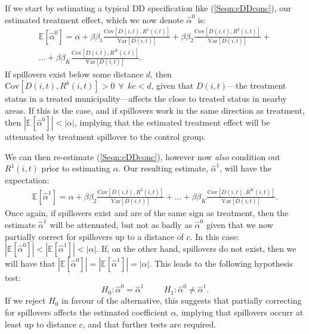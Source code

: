 \documentclass{article}
\newcommand{\Var}{\mathrm{Var}}
\newcommand{\Cov}{\mathrm{Cov}}
\newcommand{\Bias}[2]{\frac{\Cov[#1,#2]}{\Var[#1]}}
\begin{document}
\begin{spacing}{1.1}
If we start by estimating a typical DD specification like (\ref{Seqn:cDDconc}),
our estimated treatment effect, which we now denote $\hat\alpha^0$ is:
\begin{equation}
\nonumber
\begin{split}
\mathbb{E}[\hat\alpha^0]=\alpha + \beta\beta_1\Bias{D(i,t)}{R^1(i,t)}
                                + \beta\beta_2\Bias{D(i,t)}{R^2(i,t)}
                                + \\ \ldots
                                + \beta\beta_K\Bias{D(i,t)}{R^K(i,t)}.
\end{split}
\end{equation}
If spillovers exist below some distance $d$, then 
$\Cov[D(i,t),R^k(i,t)]>0 \ \ \forall \ \ kc<d$, given that $D(i,t)$---the treatment
status in a treated municipality---affects the close to treated status in nearby 
areas. If this is the case, and if 
spillovers work in the same direction as treatment, then $|\mathbb{E}[\hat\alpha^0]|
<|\alpha|$, implying that the estimated treatment effect will be attenuated by 
treatment spillover to the control group.  

We can then re-estimate (\ref{Seqn:cDDconc}), however now \emph{also} condition
out $R^1(i,t)$ prior to estimating $\alpha$.  Our resulting estimate, $\hat\alpha^1$,
will have the expectation:
\begin{equation}
\nonumber
\begin{split}
\mathbb{E}[\hat\alpha^1]=\alpha + \beta\beta_2\Bias{D(i,t)}{R^2(i,t)}
                                + \ldots
                                + \beta\beta_K\Bias{D(i,t)}{R^K(i,t)}.
\end{split}
\end{equation}
Once again, if spillovers exist and are of the same sign as treatment, then the
estimate $\hat\alpha^1$ will be attenuated, but not as badly as $\hat\alpha^0$ given
that we now partially correct for spillovers up to a distance of $c$.  In this case:
$|\mathbb{E}[\hat\alpha^0]|<|\mathbb{E}[\hat\alpha^1]|<|\alpha|$.  If, on the other
hand, spillovers do not exist, then we will have that $|\mathbb{E}[\hat\alpha^0]|=
|\mathbb{E}[\hat\alpha^1]|=|\alpha|$.  This leads to the following hypothesis test:
\[
H_0: \hat\alpha^0=\hat\alpha^1 \hspace{1cm}
H_1: \hat\alpha^0\neq\hat\alpha^1.
\]
If we reject $H_0$ in favour of the alternative, this suggests that partially 
correcting for spillovers affects the estimated coefficient $\alpha$, implying that
spillovers occurr at least up to distance $c$, and that further tests are required.  


\end{spacing}
\end{document}
